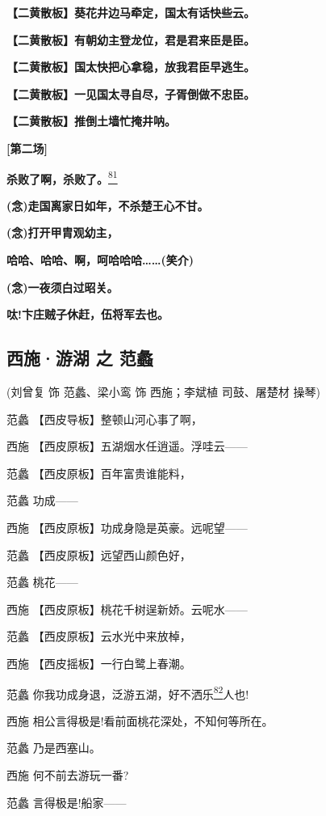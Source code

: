 \textbf{【二黄散板】葵花井边马牵定，国太有话快些云。}

\textbf{【二黄散板】有朝幼主登龙位，君是君来臣是臣。}

\textbf{【二黄散板】国太快把心拿稳，放我君臣早逃生。}

\textbf{【二黄散板】一见国太寻自尽，子胥倒做不忠臣。}

\textbf{【二黄散板】推倒土墙忙掩井呐。}

\textbf{{[}第二场{]}}

\textbf{杀败了啊，杀败了。}\protect\hyperlink{fn81}{\textsuperscript{81}}

\textbf{(念)走国离家日如年，不杀楚王心不甘。}

\textbf{(念)打开甲胄观幼主，}

\textbf{哈哈、哈哈、啊，呵哈哈哈\ldots{}\ldots{}(笑介)}

\textbf{(念)一夜须白过昭关。}

\textbf{呔!卞庄贼子休赶，伍将军去也。}

\newpage
\hypertarget{ux897fux65bdux6e38ux6e56-ux4e4b-ux8303ux8821}{%
\subsection{西施·游湖 之
范蠡}\label{ux897fux65bdux6e38ux6e56-ux4e4b-ux8303ux8821}}

(刘曾复 饰 范蠡、梁小鸾 饰 西施；李斌植 司鼓、屠楚材 操琴)

范蠡 【西皮导板】整顿山河心事了啊，

西施 【西皮原板】五湖烟水任逍遥。浮哇云------

范蠡 【西皮原板】百年富贵谁能料，

范蠡 功成------

西施 【西皮原板】功成身隐是英豪。远呢望------

范蠡 【西皮原板】远望西山颜色好，

范蠡 桃花------

西施 【西皮原板】桃花千树逞新娇。云呢水------

范蠡 【西皮原板】云水光中来放棹，

西施 【西皮摇板】一行白鹭上春潮。

范蠡
你我功成身退，泛游五湖，好不洒乐\protect\hyperlink{fn82}{\textsuperscript{82}}人也!

西施 相公言得极是!看前面桃花深处，不知何等所在。

范蠡 乃是西塞山。

西施 何不前去游玩一番?

范蠡 言得极是!船家------

